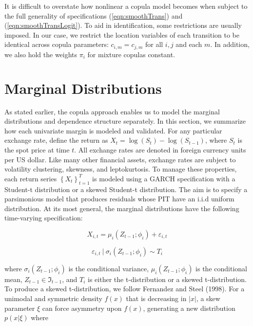\documentclass[12pt]{article}
\begin{document}
It is difficult to overstate how nonlinear a copula model becomes when subject to the full generality of specifications (\ref{eqn:smoothTrans}) and (\ref{eqn:smoothTransLogit}). To aid in identification, some restrictions are usually imposed. In our case, we restrict the location variables of each transition to be identical across copula parameters: $c_{i,m}=c_{j,m}$ for all $i,j$ and each $m$. In addition, we also hold the weights $\pi_{i}$ for mixture copulas constant.

\section{Marginal Distributions}

As stated earlier, the copula approach enables us to model the marginal distributions and dependence structure separately. In this section, we summarize how each univariate margin is modeled and validated. For any particular exchange rate, define the return as $X_{t} = \log \left(S_{t}\right) - \log\left(S_{t-1}\right)$, where $S_{t}$ is the spot price at time $t$. All exchange rates are denoted in foreign currency units per US dollar. Like many other financial assets, exchange rates are subject to volatility clustering, skewness, and leptokurtosis. To manage these properties, each return series $\left\{X_{t}\right\}_{t=1}^{T}$ is modeled using a GARCH specification with a Student-t distribution or a skewed Student-t distribution. The aim is to specify a parsimonious model that produces residuals whose PIT have an i.i.d uniform distribution. At its most general, the marginal distributions have the following time-varying specification:

\begin{equation} \label{eqn:marginalModel}
X_{i,t} = \mu_{i}\left(Z_{t - 1}; \phi_{i}\right) + \varepsilon_{i,t}
\end{equation}

\begin{equation}
\varepsilon_{i,t}~|~\sigma_{i}\left(Z_{t - 1}; \phi_{i}\right) \sim T_{i}
\end{equation}

where $\sigma_{i}\left(Z_{t - 1}; \phi_{i}\right)$ is the conditional variance, $\mu_{i}\left(Z_{t - 1}; \phi_{i}\right)$ is the conditional mean, $Z_{t - 1} \in \Im_{t-1}$, and $T_{i}$ is either the t-distribution or a skewed t-distribution. To produce a skewed t-distribution, we follow Fernandez and Steel (1998). For a unimodal and symmetric density $f\left(x\right)$ that is decreasing in $\left\vert x\right\vert$, a skew parameter $\xi$ can force asymmetry upon $f\left(x\right)$, generating a new distribution $p\left(x|\xi\right)$ where
\end{document}

